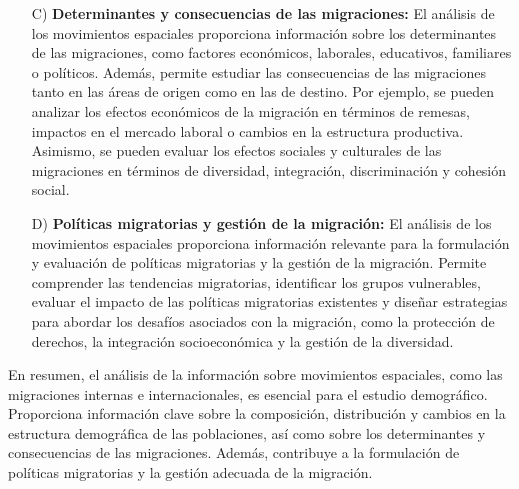 \documentclass[8pt,a4paper]{beamer}
\begin{document}
{\begin{frame}{}
\begin{block}{}
\begin{enumerate}
\item[C)] \textbf{Determinantes y consecuencias de las migraciones:} El análisis de los movimientos espaciales proporciona información sobre los determinantes de las migraciones, como factores económicos, laborales, educativos, familiares o políticos. Además, permite estudiar las consecuencias de las migraciones tanto en las áreas de origen como en las de destino. Por ejemplo, se pueden analizar los efectos económicos de la migración en términos de remesas, impactos en el mercado laboral o cambios en la estructura productiva. Asimismo, se pueden evaluar los efectos sociales y culturales de las migraciones en términos de diversidad, integración, discriminación y cohesión social.
\end{enumerate}
\end{block}
\end{frame}


\begin{frame}{}
\begin{block}{}
\justifying

\begin{enumerate}
\justifying

\item[D)] \textbf{Políticas migratorias y gestión de la migración:} El análisis de los movimientos espaciales proporciona información relevante para la formulación y evaluación de políticas migratorias y la gestión de la migración. Permite comprender las tendencias migratorias, identificar los grupos vulnerables, evaluar el impacto de las políticas migratorias existentes y diseñar estrategias para abordar los desafíos asociados con la migración, como la protección de derechos, la integración socioeconómica y la gestión de la diversidad.
\end{enumerate}
En resumen, el análisis de la información sobre movimientos espaciales, como las migraciones internas e internacionales, es esencial para el estudio demográfico. Proporciona información clave sobre la composición, distribución y cambios en la estructura demográfica de las poblaciones, así como sobre los determinantes y consecuencias de las migraciones. Además, contribuye a la formulación de políticas migratorias y la gestión adecuada de la migración.
\end{block}
\end{frame}

}
\end{document}
